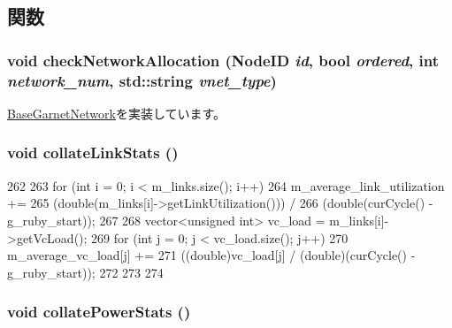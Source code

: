 \subsection{関数}
\hypertarget{classGarnetNetwork__d_ad98444c4b69e4656dd10dc4ea3ad80dd}{
\subsubsection[{checkNetworkAllocation}]{\setlength{\rightskip}{0pt plus 5cm}void checkNetworkAllocation ({\bf NodeID} {\em id}, \/  bool {\em ordered}, \/  int {\em network\_\-num}, \/  std::string {\em vnet\_\-type})}}
\label{classGarnetNetwork__d_ad98444c4b69e4656dd10dc4ea3ad80dd}


\hyperlink{classBaseGarnetNetwork_a17adbaf838763d6fd04e9dbf53536b15}{BaseGarnetNetwork}を実装しています。\hypertarget{classGarnetNetwork__d_a0a24c83319631e21d9b9721762c8c6d4}{
\subsubsection[{collateLinkStats}]{\setlength{\rightskip}{0pt plus 5cm}void collateLinkStats ()}}
\label{classGarnetNetwork__d_a0a24c83319631e21d9b9721762c8c6d4}



\begin{DoxyCode}
262 {
263     for (int i = 0; i < m_links.size(); i++) {
264         m_average_link_utilization +=
265             (double(m_links[i]->getLinkUtilization())) /
266             (double(curCycle() - g_ruby_start));
267 
268         vector<unsigned int> vc_load = m_links[i]->getVcLoad();
269         for (int j = 0; j < vc_load.size(); j++) {
270             m_average_vc_load[j] +=
271                 ((double)vc_load[j] / (double)(curCycle() - g_ruby_start));
272         }
273     }
274 }
\end{DoxyCode}
\hypertarget{classGarnetNetwork__d_a35d51fcf68be8835a47c32ebd1a99182}{
\subsubsection[{collatePowerStats}]{\setlength{\rightskip}{0pt plus 5cm}void collatePowerStats ()}}
\label{classGarnetNetwork__d_a35d51fcf68be8835a47c32ebd1a99182}



